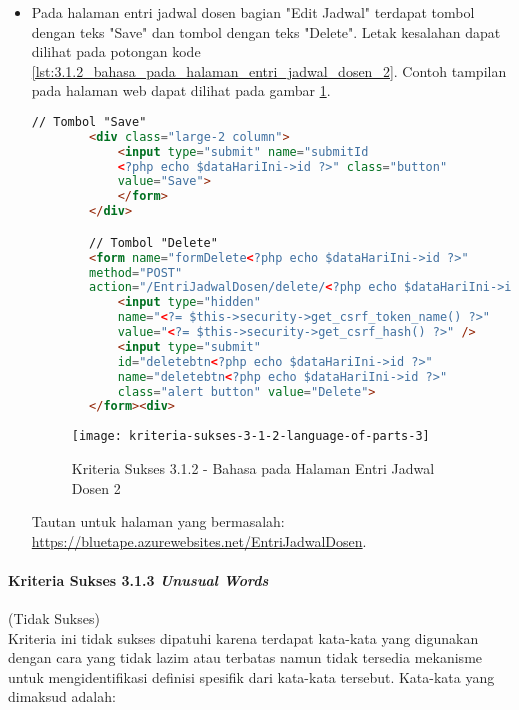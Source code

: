 \begin{itemize}
    \item Pada halaman entri jadwal dosen bagian "Edit Jadwal" terdapat tombol dengan teks "Save" dan tombol dengan teks "Delete". Letak kesalahan dapat dilihat pada potongan kode \ref{lst:3.1.2_bahasa_pada_halaman_entri_jadwal_dosen_2}. Contoh tampilan pada halaman web dapat dilihat pada gambar \ref{fig:3.1.2_language_of_parts_3}. 
    \begin{lstlisting}[frame=single, label={lst:3.1.2_bahasa_pada_halaman_entri_jadwal_dosen_2}, language=HTML, caption=Kriteria Sukses 3.1.2 - Bahasa yang Tidak Sesuai pada Halaman Entri Jadwal Dosen 2]
        // Tombol "Save"
        <div class="large-2 column">
            <input type="submit" name="submitId
            <?php echo $dataHariIni->id ?>" class="button" 
            value="Save">
            </form>
        </div>

        // Tombol "Delete"
        <form name="formDelete<?php echo $dataHariIni->id ?>" 
        method="POST" 
        action="/EntriJadwalDosen/delete/<?php echo $dataHariIni->id ?>">    
            <input type="hidden" 
            name="<?= $this->security->get_csrf_token_name() ?>" 
            value="<?= $this->security->get_csrf_hash() ?>" />
            <input type="submit" 
            id="deletebtn<?php echo $dataHariIni->id ?>" 
            name="deletebtn<?php echo $dataHariIni->id ?>" 
            class="alert button" value="Delete">
        </form><div>
    \end{lstlisting}
    
    \begin{figure}[H]
        \centering  
        \texttt{[image: kriteria-sukses-3-1-2-language-of-parts-3]}  
        \caption[Kriteria Sukses 3.1.2 - Bahasa pada Halaman Entri Jadwal Dosen 2]{Kriteria Sukses 3.1.2 - Bahasa pada Halaman Entri Jadwal Dosen 2}
        \label{fig:3.1.2_language_of_parts_3}  
    \end{figure}
    Tautan untuk halaman yang bermasalah: \url{https://bluetape.azurewebsites.net/EntriJadwalDosen}.

\end{itemize}

\paragraph{Kriteria Sukses 3.1.3 \textit{Unusual Words}}
\label{par:kepatuhan_bluetape_kriteria_sukses_3.1.3}
(Tidak Sukses)\\

Kriteria ini tidak sukses dipatuhi karena terdapat kata-kata yang digunakan dengan cara yang tidak lazim atau terbatas namun tidak tersedia mekanisme untuk mengidentifikasi definisi spesifik dari kata-kata tersebut. Kata-kata yang dimaksud adalah:

